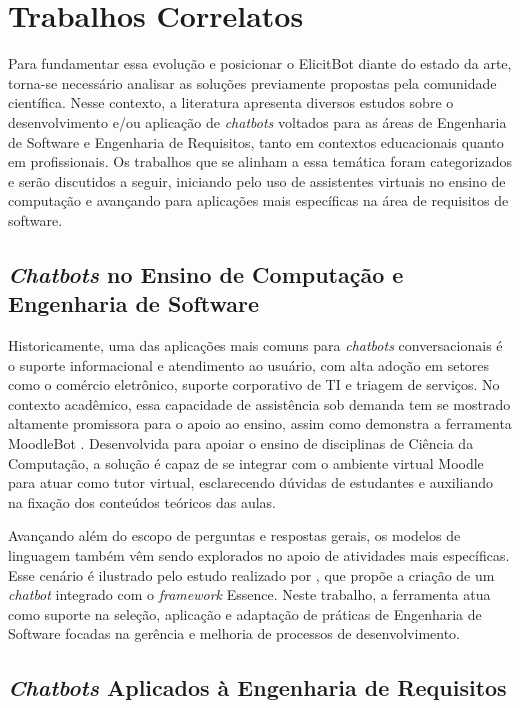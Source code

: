 \section{Trabalhos Correlatos}
\label{sec:trabalhos_correlatos}

Para fundamentar essa evolução e posicionar o ElicitBot diante do estado da arte, torna-se necessário analisar as soluções previamente propostas pela comunidade científica. Nesse contexto, a literatura apresenta diversos estudos sobre o desenvolvimento e/ou aplicação de \textit{chatbots} voltados para as áreas de Engenharia de Software e Engenharia de Requisitos, tanto em contextos educacionais quanto em profissionais. Os trabalhos que se alinham a essa temática foram categorizados e serão discutidos a seguir, iniciando pelo uso de assistentes virtuais no ensino de computação e avançando para aplicações mais específicas na área de requisitos de software.

\subsection{\textit{Chatbots} no Ensino de Computação e Engenharia de Software}

Historicamente, uma das aplicações mais comuns para \textit{chatbots} conversacionais é o suporte informacional e atendimento ao usuário, com alta adoção em setores como o comércio eletrônico, suporte corporativo de TI e triagem de serviços. No contexto acadêmico, essa capacidade de assistência sob demanda tem se mostrado altamente promissora para o apoio ao ensino, assim como demonstra a ferramenta MoodleBot \cite{neumann2025}. Desenvolvida para apoiar o ensino de disciplinas de Ciência da Computação, a solução é capaz de se integrar com o ambiente virtual Moodle para atuar como tutor virtual, esclarecendo dúvidas de estudantes e auxiliando na fixação dos conteúdos teóricos das aulas.

Avançando além do escopo de perguntas e respostas gerais, os modelos de linguagem também vêm sendo explorados no apoio de atividades mais específicas. Esse cenário é ilustrado pelo estudo realizado por , que propõe a criação de um \textit{chatbot} integrado com o \textit{framework} Essence. Neste trabalho, a ferramenta atua como suporte na seleção, aplicação e adaptação de práticas de Engenharia de Software focadas na gerência e melhoria de processos de desenvolvimento.

\subsection{\textit{Chatbots} Aplicados à Engenharia de Requisitos}

